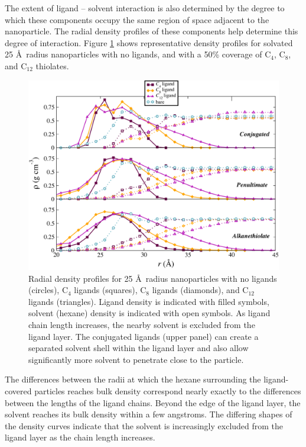 The extent of ligand -- solvent interaction is also determined by the
degree to which these components occupy the same region of space
adjacent to the nanoparticle. The radial density profiles of these
components help determine this degree of interaction.  Figure
\ref{fig:density} shows representative density profiles for solvated
25 \AA\ radius nanoparticles with no ligands, and with a 50\% coverage
of C$_{4}$, C$_{8}$, and C$_{12}$ thiolates.

\begin{figure}
  \includegraphics[width=\linewidth]{figures/density}
  \caption{Radial density profiles for 25 \AA\ radius nanoparticles
    with no ligands (circles), C$_{4}$ ligands (squares), C$_{8}$
    ligands (diamonds), and C$_{12}$ ligands (triangles). Ligand
    density is indicated with filled symbols, solvent (hexane) density
    is indicated with open symbols. As ligand chain length increases,
    the nearby solvent is excluded from the ligand layer.  The
    conjugated ligands (upper panel) can create a separated solvent
    shell within the ligand layer and also allow significantly more
    solvent to penetrate close to the particle.}
  \label{fig:density}
\end{figure}

The differences between the radii at which the hexane surrounding the
ligand-covered particles reaches bulk density correspond nearly
exactly to the differences between the lengths of the ligand
chains. Beyond the edge of the ligand layer, the solvent reaches its
bulk density within a few angstroms. The differing shapes of the
density curves indicate that the solvent is increasingly excluded from
the ligand layer as the chain length increases.

